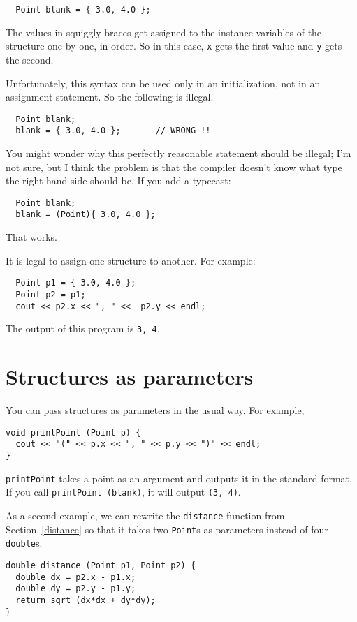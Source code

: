 \begin{verbatim}
  Point blank = { 3.0, 4.0 };
\end{verbatim}
%
The values in squiggly braces get assigned to the instance variables of
the structure one by one, in order.  So in this case, {\tt x}
gets the first value and {\tt y} gets the second.

Unfortunately, this syntax can be used only in an initialization,
not in an assignment statement.  So the following is illegal.

\begin{verbatim}
  Point blank;
  blank = { 3.0, 4.0 };       // WRONG !!
\end{verbatim}
%
You might wonder why this perfectly reasonable statement should
be illegal; I'm not sure, but I think the problem is that the compiler
doesn't know what type the right hand side should be.  If you
add a typecast:

\begin{verbatim}
  Point blank;
  blank = (Point){ 3.0, 4.0 };
\end{verbatim}
%
That works.

It is legal to assign one structure to
another.  For example:

\begin{verbatim}
  Point p1 = { 3.0, 4.0 };
  Point p2 = p1;
  cout << p2.x << ", " <<  p2.y << endl;
\end{verbatim}
%
The output of this program is {\tt 3, 4}.

\section{Structures as parameters}

You can pass structures as parameters in the usual way.  For
example,

\begin{verbatim}
void printPoint (Point p) {
  cout << "(" << p.x << ", " << p.y << ")" << endl;
}
\end{verbatim}
%
{\tt printPoint} takes a point as an argument and outputs it in
the standard format.  If you call {\tt printPoint (blank)},
it will output {\tt (3, 4)}.

As a second example, we can rewrite the {\tt distance} function from
Section~\ref{distance} so that it takes two {\tt Point}s as parameters
instead of four {\tt double}s.

\begin{verbatim}
double distance (Point p1, Point p2) {
  double dx = p2.x - p1.x;
  double dy = p2.y - p1.y;
  return sqrt (dx*dx + dy*dy);
}
\end{verbatim}

